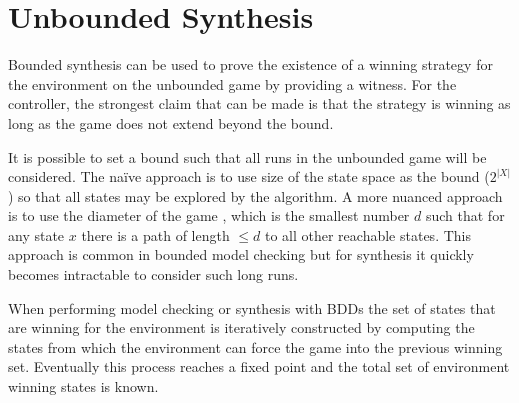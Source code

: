 \documentclass{llncs}
\begin{document}


\section{Unbounded Synthesis}

\label{sect:unbounded}

Bounded synthesis can be used to prove the existence of a winning strategy for
the environment on the unbounded game by providing a witness. For the
controller, the strongest claim that can be made is that the strategy is
winning as long as the game does not extend beyond the bound.

It is possible to set a bound such that all runs in the unbounded game will be
considered. The na\"ive approach is to use size of the state space as the bound
($2^{|X|}$) so that all states may be explored by the algorithm. A more nuanced
approach is to use the diameter of the game \cite{biere1999}, which is the
smallest number $d$ such that for any state $x$ there is a path of length $\leq
d$ to all other reachable states. This approach is common in bounded model
checking but for synthesis it quickly becomes intractable to consider such long
runs.

When performing model checking or synthesis with BDDs \cite{burch1990} the set
of states that are winning for the environment is iteratively constructed by
computing the states from which the environment can force the game into the
previous winning set. Eventually this process reaches a fixed point and the
total set of environment winning states is known.
\end{document}
